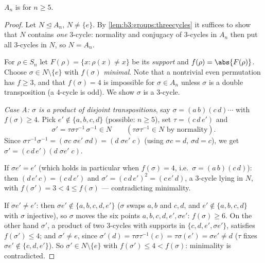 \begin{theorem}\label{thm:b3:groups:ansimple}
$A_n$ is  for $n \geq 5$.
\end{theorem}

\begin{proof}
Let $N \trianglelefteq A_n$, $N \neq \{e\}$. By
\cref{lem:b3:groups:threecycles} it suffices to show that $N$
contains \emph{one} $3$-cycle: normality and conjugacy of
$3$-cycles in $A_n$ then put all $3$-cycles in $N$, so $N = A_n$.

For $\rho \in S_n$ let $F(\rho) = \{x : \rho(x) \neq x\}$ be its
\emph{support} and $f(\rho) = \abs{F(\rho)}$. Choose $\sigma \in N
\setminus \{e\}$ with $f(\sigma)$ \emph{minimal}. Note that a
nontrivial even permutation has $f \geq 3$, and that $f(\sigma) =
4$ is impossible for $\sigma \in A_n$ unless $\sigma$ is a double
transposition (a $4$-cycle is odd). We show $\sigma$ is a
$3$-cycle.

\emph{Case A: $\sigma$ is a product of disjoint transpositions},
say $\sigma = (a\,b)(c\,d)\cdots$ with $f(\sigma) \geq 4$. Pick $e'
\notin \{a, b, c, d\}$ (possible: $n \geq 5$), set $\tau =
(c\,d\,e')$ and
\[
\sigma' = \tau\sigma\tau^{-1}\,\sigma^{-1} \in N
\qquad (\tau\sigma\tau^{-1} \in N \text{ by normality}).
\]
Since $\sigma\tau^{-1}\sigma^{-1} = (\sigma c\;\sigma e'\;\sigma
d) = (d\;\sigma e'\;c)$ (using $\sigma c = d$, $\sigma d = c$), we
get $\sigma' = (c\,d\,e')(d\;\sigma e'\;c)$.

If $\sigma e' = e'$ (which holds in particular when $f(\sigma) =
4$, i.e.\ $\sigma = (a\,b)(c\,d)$): then $(d\,e'\,c) =
(c\,d\,e')$ and $\sigma' = (c\,d\,e')^2 = (c\,e'\,d)$, a
$3$-cycle lying in $N$, with $f(\sigma') = 3 < 4 \leq f(\sigma)$
--- contradicting minimality.

If $\sigma e' \neq e'$: then $\sigma e' \notin \{a, b, c, d,
e'\}$ ($\sigma$ swaps $a,b$ and $c,d$, and $e' \notin \{a,b,c,d\}$
with $\sigma$ injective), so $\sigma$ moves the six points $a, b,
c, d, e', \sigma e'$: $f(\sigma) \geq 6$. On the other hand
$\sigma'$, a product of two $3$-cycles with supports in $\{c, d,
e', \sigma e'\}$, satisfies $f(\sigma') \leq 4$; and $\sigma' \neq
e$, since $\sigma'(d) = \tau\sigma\tau^{-1}(c) = \tau\sigma(e') =
\sigma e' \neq d$ ($\tau$ fixes $\sigma e' \notin \{c,d,e'\}$).
So $\sigma' \in N \setminus\{e\}$ with $f(\sigma') \leq 4 <
f(\sigma)$: minimality is contradicted.


\end{proof}
